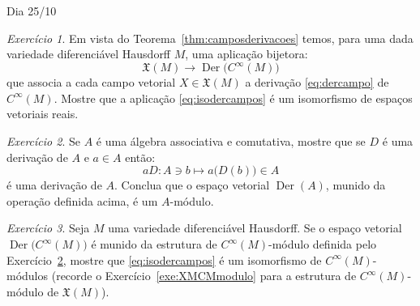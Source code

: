 \documentclass[oneside,11pt]{amsart}
\DeclareMathOperator{\Der}{Der}
\theoremstyle{remark}\newtheorem{exercise}{Exercício}[section]
\theoremstyle{plain}\newtheorem{teo}{Teorema}[section]
\theoremstyle{plain}\newtheorem{lem}[teo]{Lema}
\theoremstyle{plain}\newtheorem{prop}[teo]{Proposição}
\theoremstyle{definition}\newtheorem{defin}[teo]{Definição}
\theoremstyle{remark}\newtheorem{rem}[teo]{Observação}
\theoremstyle{definition}\newtheorem{example}[teo]{Exemplo}
\numberwithin{equation}{section}
\begin{document}
\begin{section}{Dia 25/10}
\begin{exercise}\label{exe:isoDerXM}
Em vista do Teorema~\ref{thm:camposderivacoes} temos, para uma dada variedade diferenciável Hausdorff $M$, uma aplicação bijetora:
\begin{equation}\label{eq:isodercampos}
\mathfrak X(M)\longrightarrow\Der\!\big(C^\infty(M)\big)
\end{equation}
que associa a cada campo vetorial $X\in\mathfrak X(M)$ a derivação \eqref{eq:dercampo} de $C^\infty(M)$. Mostre que a aplicação \eqref{eq:isodercampos}
é um isomorfismo de espaços vetoriais reais.
\end{exercise}

\begin{exercise}\label{exe:Amodulo}
Se $A$ é uma álgebra associativa e comutativa, mostre que se $D$ é uma derivação de $A$ e $a\in A$ então:
\[aD:A\ni b\longmapsto a\big(D(b)\big)\in A\]
é uma derivação de $A$. Conclua que o espaço vetorial $\Der(A)$, munido da operação definida acima, é um $A$-módulo.
\end{exercise}

\begin{exercise}\label{exe:isoAmodulos}
Seja $M$ uma variedade diferenciável Hausdorff. Se o espaço vetorial $\Der\!\big(C^\infty(M)\big)$ é munido da estrutura de $C^\infty(M)$-módulo definida pelo Exercício~\ref{exe:Amodulo},
mostre que \eqref{eq:isodercampos} é um isomorfismo de $C^\infty(M)$-módulos (recorde o Exercício~\ref{exe:XMCMmodulo} para a estrutura de $C^\infty(M)$-módulo
de $\mathfrak X(M)$).
\end{exercise}

\end{section}
\end{document}
